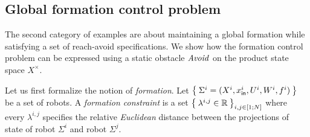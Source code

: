 \subsection{Global formation control problem}\label{sec:global formation control}

The second category of examples are about maintaining a global formation while satisfying a set of reach-avoid specifications.
We show how the formation control problem can be expressed using a static obstacle $\mathit{Avoid}$ on the product state space $X^\times$.

Let us first formalize the notion of \emph{formation}.
Let $\Set{\Sigma^i=(X^i,x_{\mathsf{in}}^i,U^i,W^i,f^i)}$ be a set of robots.
A \emph{formation constraint} is a set $\Set{\lambda^{i,j}\in \mathbb{R}}_{i,j\in [1;N]}$ where every $\lambda^{i,j}$ specifies the relative \emph{Euclidean} 
distance between the projections of state of robot $\Sigma^i$ and robot $\Sigma^j$.%

